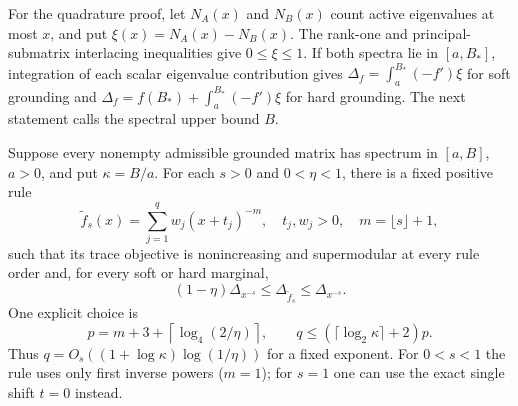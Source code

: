 For the quadrature proof, let $N_A(x)$ and $N_B(x)$ count
active eigenvalues at most $x$, and put $\xi(x)=N_A(x)-N_B(x)$.
The rank-one and principal-submatrix interlacing inequalities give
$0\leq\xi\leq1$. If both spectra lie in $[a,B_*]$, integration
of each scalar eigenvalue contribution gives
$\Delta_f=\int_a^{B_*}(-f')\xi$ for soft grounding and
$\Delta_f=f(B_*)+\int_a^{B_*}(-f')\xi$ for hard grounding.
The next statement calls the spectral upper bound $B$.
\begin{theorem}\label{thm:fixedquad}
Suppose every nonempty admissible grounded matrix has spectrum in
$[a,B]$, $a>0$, and put $\kappa=B/a$. For each $s>0$ and
$0<\eta<1$, there is a fixed positive rule
\[
 \widetilde f_s(x)=\sum_{j=1}^q w_j(x+t_j)^{-m},\quad
 t_j,w_j>0,\quad m=\lfloor s\rfloor+1,
\]
such that its trace objective is nonincreasing and supermodular at
every rule order and, for every soft or hard marginal,
\begin{equation}\label{eq:fixedrelative}
 (1-\eta)\Delta_{x^{-s}}\leq\Delta_{\widetilde f_s}\leq\Delta_{x^{-s}}.
\end{equation}
One explicit choice is
\[
 p=m+3+\left\lceil\log_4(2/\eta)\right\rceil,\qquad
 q\leq(\lceil\log_2\kappa\rceil+2)p.
\]
Thus $q=O_s((1+\log\kappa)\log(1/\eta))$ for a fixed exponent.
For $0<s<1$ the rule uses only first inverse powers ($m=1$);
for $s=1$ one can use the exact single shift $t=0$ instead.
\end{theorem}
